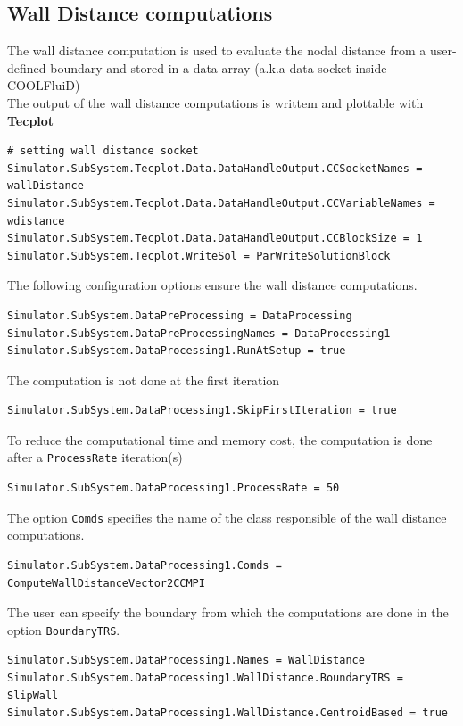 \documentclass[11pt]{article}
\begin{document}
\subsection{Wall Distance computations}
The wall distance computation is used to evaluate the nodal distance from a user-defined boundary and stored in a data array (a.k.a data socket inside COOLFluiD)\\ 
The output of the wall distance computations is writtem and plottable with \textbf{Tecplot}
\begin{lstlisting}[breaklines]
# setting wall distance socket
Simulator.SubSystem.Tecplot.Data.DataHandleOutput.CCSocketNames = wallDistance
Simulator.SubSystem.Tecplot.Data.DataHandleOutput.CCVariableNames = wdistance
Simulator.SubSystem.Tecplot.Data.DataHandleOutput.CCBlockSize = 1
Simulator.SubSystem.Tecplot.WriteSol = ParWriteSolutionBlock
\end{lstlisting}
The following configuration options ensure the wall distance computations.

\begin{lstlisting}[breaklines]
Simulator.SubSystem.DataPreProcessing = DataProcessing
Simulator.SubSystem.DataPreProcessingNames = DataProcessing1
Simulator.SubSystem.DataProcessing1.RunAtSetup = true
\end{lstlisting}
The computation is not done at the first iteration
\begin{lstlisting}[breaklines]
Simulator.SubSystem.DataProcessing1.SkipFirstIteration = true
\end{lstlisting}
To reduce the computational time and memory cost, the computation is done after a {\tt ProcessRate} iteration(s)
\begin{lstlisting}[breaklines]
Simulator.SubSystem.DataProcessing1.ProcessRate = 50
\end{lstlisting}
The option {\tt Comds} specifies the name of the class responsible of the wall distance computations.
\begin{lstlisting}[breaklines]
Simulator.SubSystem.DataProcessing1.Comds = ComputeWallDistanceVector2CCMPI
\end{lstlisting}
The user can specify the boundary from which the computations are done in the option {\tt BoundaryTRS}.
\begin{lstlisting}[breaklines]
Simulator.SubSystem.DataProcessing1.Names = WallDistance
Simulator.SubSystem.DataProcessing1.WallDistance.BoundaryTRS = SlipWall
Simulator.SubSystem.DataProcessing1.WallDistance.CentroidBased = true
\end{lstlisting}
\end{document}
